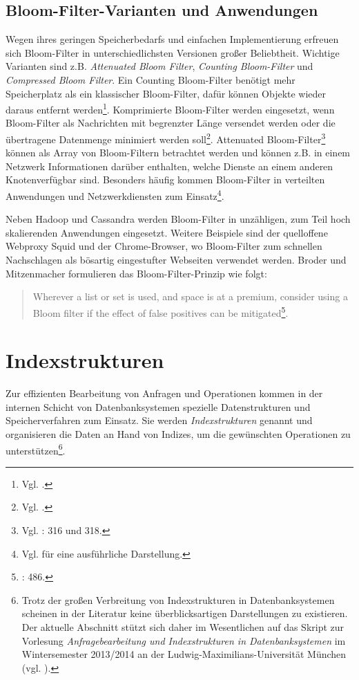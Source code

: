 \subsection{Bloom-Filter-Varianten und Anwendungen}\label{sec:bloom-anwendungen}
Wegen ihres geringen Speicherbedarfs und einfachen Implementierung erfreuen sich Bloom-Filter in unterschiedlichsten Versionen großer Beliebtheit. Wichtige Varianten sind z.B. \textit{Attenuated Bloom Filter}, \textit{Counting Bloom-Filter} und \textit{Compressed Bloom Filter}. Ein Counting Bloom-Filter benötigt mehr Speicherplatz als ein klassischer Bloom-Filter, dafür können Objekte wieder daraus entfernt werden\footnote{Vgl. \cite{Fan2000}.}. Komprimierte Bloom-Filter werden eingesetzt, wenn Bloom-Filter als Nachrichten mit begrenzter Länge versendet werden oder die übertragene Datenmenge minimiert werden soll\footnote{Vgl. \cite{Mitzenmacher2002}.}. Attenuated Bloom-Filter\footnote{Vgl. \cite{Sakuma2011}: 316 und 318.} können als Array von Bloom-Filtern betrachtet werden und können z.B. in einem Netzwerk Informationen darüber enthalten, welche Dienste an einem anderen Knotenverfügbar sind. Besonders häufig kommen Bloom-Filter in verteilten Anwendungen und Netzwerkdiensten zum Einsatz\footnote{Vgl. \cite{Broder2004} für eine ausführliche Darstellung.}. 

Neben Hadoop und Cassandra werden Bloom-Filter in unzähligen, zum Teil hoch skalierenden Anwendungen eingesetzt. Weitere Beispiele sind der quelloffene Webproxy Squid und der Chrome-Browser, wo Bloom-Filter zum schnellen Nachschlagen als bösartig eingestufter Webseiten verwendet werden. Broder und Mitzenmacher formulieren das Bloom-Filter-Prinzip wie folgt: 
\begin{quote}
Wherever a list or set is used, and space is at a premium, consider using a Bloom filter if the effect of false positives can be mitigated\footnote{\cite{Broder2004}: 486.}.
\end{quote}
\section{Indexstrukturen}\label{sec:indexstrukturen}
Zur effizienten Bearbeitung von Anfragen und Operationen kommen in der internen Schicht von Datenbanksystemen spezielle Datenstrukturen und Speicherverfahren zum Einsatz. Sie werden \textit{Indexstrukturen} genannt und organisieren die Daten an Hand von Indizes, um die gewünschten Operationen zu unterstützen\footnote{Trotz der großen Verbreitung von Indexstrukturen in Datenbanksystemen scheinen in der Literatur keine überblicksartigen Darstellungen zu existieren. Der aktuelle Abschnitt stützt sich daher im Wesentlichen auf das Skript zur Vorlesung \textit{Anfragebearbeitung und Indexstrukturen in Datenbanksystemen} im Wintersemester 2013/2014 an der Ludwig-Maximilians-Universität München (vgl. \cite{Kriegel1994--2013}).}.


